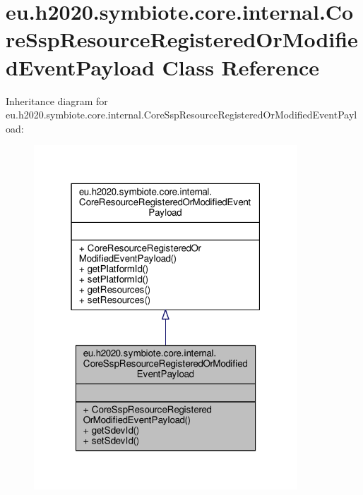\hypertarget{classeu_1_1h2020_1_1symbiote_1_1core_1_1internal_1_1CoreSspResourceRegisteredOrModifiedEventPayload}{}\section{eu.\+h2020.\+symbiote.\+core.\+internal.\+Core\+Ssp\+Resource\+Registered\+Or\+Modified\+Event\+Payload Class Reference}
\label{classeu_1_1h2020_1_1symbiote_1_1core_1_1internal_1_1CoreSspResourceRegisteredOrModifiedEventPayload}


Inheritance diagram for eu.\+h2020.\+symbiote.\+core.\+internal.\+Core\+Ssp\+Resource\+Registered\+Or\+Modified\+Event\+Payload\+:\nopagebreak
\begin{figure}[H]
\begin{center}
\leavevmode
\includegraphics[width=280pt]{classeu_1_1h2020_1_1symbiote_1_1core_1_1internal_1_1CoreSspResourceRegisteredOrModifiedEventPayload__inherit__graph}
\end{center}
\end{figure}


